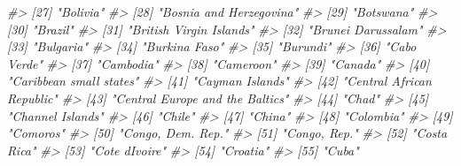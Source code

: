 \documentclass[
  xelatex, ja=standard]{bxjsbook}
\newenvironment{Shaded}{\begin{snugshade}}{\end{snugshade}}
\newcommand{\CommentTok}[1]{\textcolor[rgb]{0.56,0.35,0.01}{\textit{#1}}}
\theoremstyle{definition}
\theoremstyle{definition}
\theoremstyle{definition}
\theoremstyle{definition}
\theoremstyle{remark}
\begin{document}
\begin{Shaded}
\begin{Highlighting}[]
\CommentTok{\#\textgreater{}  [27] "Bolivia"                                             }
\CommentTok{\#\textgreater{}  [28] "Bosnia and Herzegovina"                              }
\CommentTok{\#\textgreater{}  [29] "Botswana"                                            }
\CommentTok{\#\textgreater{}  [30] "Brazil"                                              }
\CommentTok{\#\textgreater{}  [31] "British Virgin Islands"                              }
\CommentTok{\#\textgreater{}  [32] "Brunei Darussalam"                                   }
\CommentTok{\#\textgreater{}  [33] "Bulgaria"                                            }
\CommentTok{\#\textgreater{}  [34] "Burkina Faso"                                        }
\CommentTok{\#\textgreater{}  [35] "Burundi"                                             }
\CommentTok{\#\textgreater{}  [36] "Cabo Verde"                                          }
\CommentTok{\#\textgreater{}  [37] "Cambodia"                                            }
\CommentTok{\#\textgreater{}  [38] "Cameroon"                                            }
\CommentTok{\#\textgreater{}  [39] "Canada"                                              }
\CommentTok{\#\textgreater{}  [40] "Caribbean small states"                              }
\CommentTok{\#\textgreater{}  [41] "Cayman Islands"                                      }
\CommentTok{\#\textgreater{}  [42] "Central African Republic"                            }
\CommentTok{\#\textgreater{}  [43] "Central Europe and the Baltics"                      }
\CommentTok{\#\textgreater{}  [44] "Chad"                                                }
\CommentTok{\#\textgreater{}  [45] "Channel Islands"                                     }
\CommentTok{\#\textgreater{}  [46] "Chile"                                               }
\CommentTok{\#\textgreater{}  [47] "China"                                               }
\CommentTok{\#\textgreater{}  [48] "Colombia"                                            }
\CommentTok{\#\textgreater{}  [49] "Comoros"                                             }
\CommentTok{\#\textgreater{}  [50] "Congo, Dem. Rep."                                    }
\CommentTok{\#\textgreater{}  [51] "Congo, Rep."                                         }
\CommentTok{\#\textgreater{}  [52] "Costa Rica"                                          }
\CommentTok{\#\textgreater{}  [53] "Cote d\textquotesingle{}Ivoire"                                       }
\CommentTok{\#\textgreater{}  [54] "Croatia"                                             }
\CommentTok{\#\textgreater{}  [55] "Cuba"                                                }

\end{Highlighting}
\end{Shaded}
\end{document}
